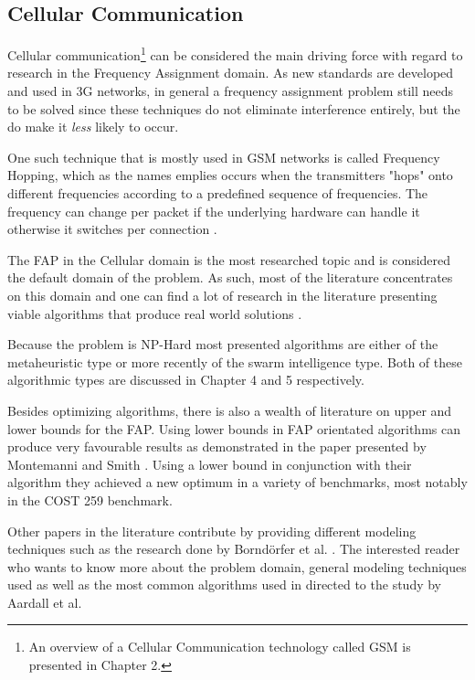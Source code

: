 \subsection{Cellular Communication}
Cellular communication\footnote{An overview of a Cellular Communication technology called GSM is presented in Chapter 2.} can be considered the main driving force with regard to research in the Frequency Assignment domain. As new standards are developed and used in 3G networks, in general a frequency assignment problem still needs to be solved since these techniques do not eliminate interference entirely, but the do make it \emph{less} likely to occur.

One such technique that is mostly used in GSM networks is called Frequency Hopping, which as the names emplies occurs when the transmitters "hops" onto different frequencies according to a predefined sequence of frequencies. The frequency can change per packet if the underlying hardware can handle it otherwise it switches per connection \cite{Karen2004,MontemanniThesis,Eisenblatter}.

The FAP in the Cellular domain is the most researched topic and is considered the default domain of the problem. As such, most of the literature concentrates on this domain and one can find a lot of research in the literature presenting viable algorithms that produce real world solutions \cite{Eisenblatter}. 

Because the problem is NP-Hard most presented algorithms are either of the metaheuristic type or more recently of the swarm intelligence type. Both of these algorithmic types are discussed in Chapter 4 and 5 respectively.

Besides optimizing algorithms, there is also a wealth of literature on upper and lower bounds for the FAP. Using lower bounds in FAP orientated algorithms can produce very favourable results as demonstrated in the paper presented by Montemanni and Smith \cite{TabuMontemanniSmith}. Using a lower bound in conjunction with their algorithm they achieved a new optimum in a variety of benchmarks, most notably in the COST 259 benchmark. 

Other papers in the literature contribute by providing different modeling techniques such as the research done by Borndörfer et al. \cite{FAPOrientationModel}. The interested reader who wants to know more about the problem domain, general modeling techniques used as well as the most common algorithms used in directed to the study by Aardall et al\cite{Karen2004}.

